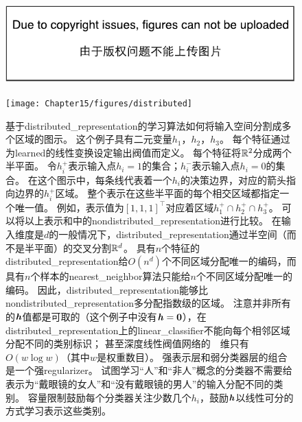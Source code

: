 

\begin{figure}[!htb]
\ifOpenSource
\centerline{\includegraphics{figure.pdf}}
\else
\centerline{\texttt{[image: Chapter15/figures/distributed]}}
\fi
\caption{基于\gls{distributed_representation}的学习算法如何将输入空间分割成多个区域的图示。
这个例子具有二元变量$h_1$，$h_2$，$h_3$。
每个特征通过为\gls{learned}的线性变换设定输出阀值而定义。
每个特征将$\mathbb{R}^2$分成两个半平面。
令$h_i^+$表示输入点$h_i=1$的集合；$h_i^-$表示输入点$h_i=0$的集合。
在这个图示中，每条线代表着一个$h_i$的决策边界，对应的箭头指向边界的$h_i^+$区域。
整个表示在这些半平面的每个相交区域都指定一个唯一值。
例如，表示值为$[1,1,1]^\top$对应着区域$h_1^+ \cap h_2^+ \cap h_3^+$。
可以将以上表示和中的\gls{nondistributed_representation}进行比较。
在输入维度是$d$的一般情况下，\gls{distributed_representation}通过半空间（而不是半平面）的交叉分割$\mathbb{R}^d$。
具有$n$个特征的\gls{distributed_representation}给$O(n^d)$个不同区域分配唯一的编码，而具有$n$个样本的\gls{nearest_neighbor}算法只能给$n$个不同区域分配唯一的编码。
因此，\gls{distributed_representation}能够比\gls{nondistributed_representation}多分配指数级的区域。
注意并非所有的$\boldsymbol{\mathit{h}}$值都是可取的（这个例子中没有$\boldsymbol{\mathit{h}}=\mathbf{0}$），在\gls{distributed_representation}上的\gls{linear_classifier}不能向每个相邻区域分配不同的类别标识；
甚至深度线性阀值网络的~~维只有$O(w\log w)$（其中$w$是权重数目）\citep{sontag1998vc}。
强表示层和弱分类器层的组合是一个强\gls{regularizer}。
试图学习``人''和``非人''概念的分类器不需要给表示为``戴眼镜的女人''和``没有戴眼镜的男人''的输入分配不同的类别。
容量限制鼓励每个分类器关注少数几个$h_i$，鼓励$\boldsymbol{\mathit{h}}$以线性可分的方式学习表示这些类别。
}
\label{fig:chap15_distributed}
\end{figure}



